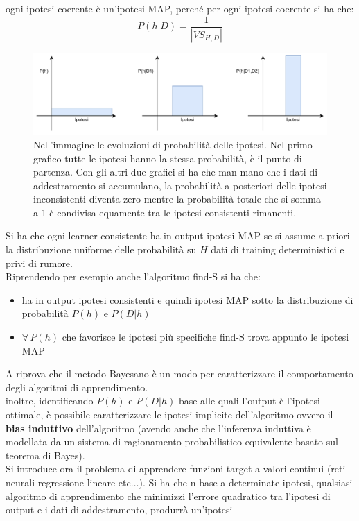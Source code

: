 \documentclass[a4paper,12pt, oneside]{book}
\begin{document}
ogni ipotesi coerente è un'ipotesi MAP, perché per ogni ipotesi coerente si ha
che:
\[P(h|D)=\frac{1}{|VS_{H,D}|}\]
\begin{figure}
  \centering
  \includegraphics[scale = 0.6]{img/map.pdf}
  \caption{Nell'immagine le evoluzioni di probabilità delle
    ipotesi. Nel primo grafico tutte le ipotesi hanno la stessa probabilità, è
    il punto di partenza. Con gli altri due grafici si ha che man mano che i
    dati di addestramento si accumulano, la probabilità a posteriori delle
    ipotesi inconsistenti diventa zero mentre la probabilità totale che si somma
    a 1 è condivisa equamente tra le ipotesi consistenti rimanenti.}
\end{figure}
Si ha che ogni learner consistente ha in output ipotesi MAP se si assume a
priori la distribuzione uniforme delle probabilità su $H$ dati di training
deterministici e privi di rumore.\\
Riprendendo per esempio anche l'algoritmo find-S si ha che:
\begin{itemize}
  \item ha in output ipotesi consistenti e quindi ipotesi MAP sotto la
  distribuzione di probabilità $P(h)$ e $P(D|h)$
  \item $\forall\,P(h)$ che favorisce le ipotesi più specifiche find-S trova
  appunto le ipotesi MAP
\end{itemize}
A riprova che il metodo Bayesano è un modo per caratterizzare il comportamento
degli algoritmi di apprendimento.\\
inoltre, identificando $P(h)$ e $P(D|h)$ base alle quali l'output è l'ipotesi
ottimale, è possibile caratterizzare le ipotesi implicite dell'algoritmo ovvero
il \textbf{bias induttivo} dell'algoritmo (avendo anche che l'inferenza
induttiva è modellata da un sistema di ragionamento probabilistico equivalente
basato sul teorema di Bayes). \\
Si introduce ora il problema di apprendere funzioni target a valori continui
(reti neurali regressione lineare etc$\ldots$). Si ha che n base a determinate
ipotesi, qualsiasi algoritmo di apprendimento che minimizzi l'errore quadratico
tra l'ipotesi di output e i dati di addestramento, produrrà un'ipotesi
\end{document}

